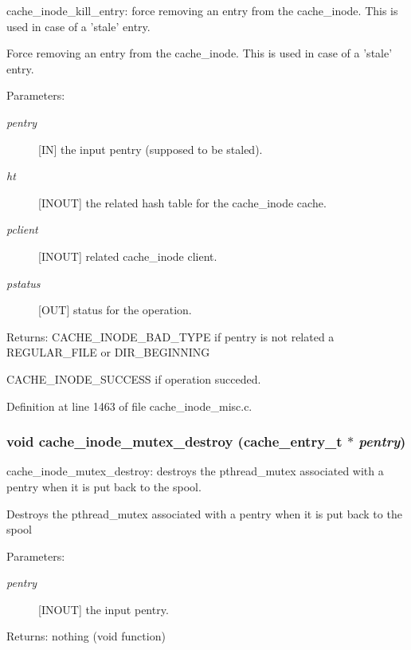 cache\_\-inode\_\-kill\_\-entry: force removing an entry from the cache\_\-inode. This is used in case of a 'stale' entry.

Force removing an entry from the cache\_\-inode. This is used in case of a 'stale' entry.

\begin{Desc}
\item[Parameters:]
\begin{description}
\item[{\em pentry}][IN] the input pentry (supposed to be staled). \item[{\em ht}][INOUT] the related hash table for the cache\_\-inode cache. \item[{\em pclient}][INOUT] related cache\_\-inode client. \item[{\em pstatus}][OUT] status for the operation.\end{description}
\end{Desc}
\begin{Desc}
\item[Returns:]CACHE\_\-INODE\_\-BAD\_\-TYPE if pentry is not related a REGULAR\_\-FILE or DIR\_\-BEGINNING \par
 

CACHE\_\-INODE\_\-SUCCESS if operation succeded. \end{Desc}


Definition at line 1463 of file cache\_\-inode\_\-misc.c.
\subsubsection[{cache\_\-inode\_\-mutex\_\-destroy}]{\setlength{\rightskip}{0pt plus 5cm}void cache\_\-inode\_\-mutex\_\-destroy (cache\_\-entry\_\-t $\ast$ {\em pentry})}\label{cache__inode__misc_8c_5c72fb619678af886176784ba7250b3c}


cache\_\-inode\_\-mutex\_\-destroy: destroys the pthread\_\-mutex associated with a pentry when it is put back to the spool.

Destroys the pthread\_\-mutex associated with a pentry when it is put back to the spool

\begin{Desc}
\item[Parameters:]
\begin{description}
\item[{\em pentry}][INOUT] the input pentry.\end{description}
\end{Desc}
\begin{Desc}
\item[Returns:]nothing (void function) \end{Desc}


